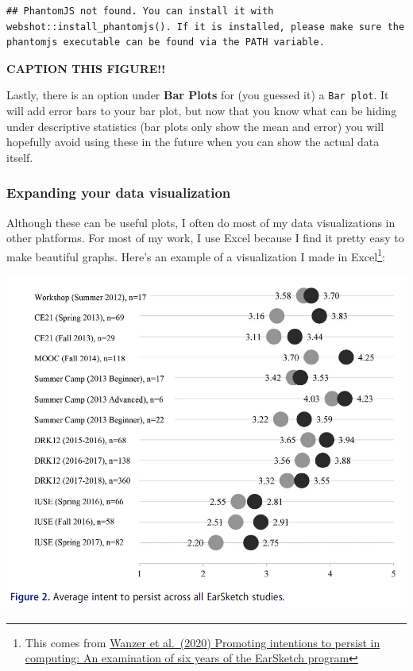\documentclass[
]{book}
\begin{document}
\begin{verbatim}
## PhantomJS not found. You can install it with webshot::install_phantomjs(). If it is installed, please make sure the phantomjs executable can be found via the PATH variable.
\end{verbatim}

\label{fig:unnamed-chunk-1}\textbf{CAPTION THIS FIGURE!!}

Lastly, there is an option under \textbf{Bar Plots} for (you guessed it) a \texttt{Bar\ plot}. It will add error bars to your bar plot, but now that you know what can be hiding under descriptive statistics (bar plots only show the mean and error) you will hopefully avoid using these in the future when you can show the actual data itself.

\hypertarget{expanding-your-data-visualization}{%
\subsubsection{Expanding your data visualization}\label{expanding-your-data-visualization}}

Although these can be useful plots, I often do most of my data visualizations in other platforms. For most of my work, I use Excel because I find it pretty easy to make beautiful graphs. Here's an example of a visualization I made in Excel\footnote{This comes from \href{https://doi.org/10.1080/08993408.2020.1714313}{Wanzer et al.~(2020) Promoting intentions to persist in computing: An examination of six years of the EarSketch program}}:

\includegraphics{images/02-stats-foundations/example3.png}
\end{document}
